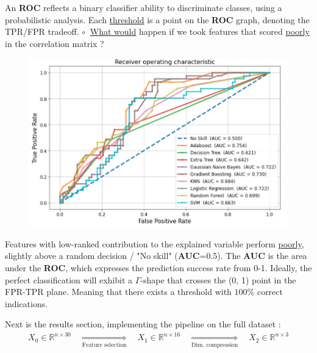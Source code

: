 \documentclass[12pt]{article}
\numberwithin{equation}{section}
\begin{document}
\begin{flushleft}
An \textbf{ROC} reflects a binary classifier ability to discriminate classes, using a probabilistic analysis. Each \underline{threshold} is a point on the \textbf{ROC} graph, denoting the TPR/FPR tradeoff. $\circ \ $ \underline{What would} happen if we took features that scored \underline{poorly} in the correlation matrix ?
\begin{figure}[H]
\centering
\includegraphics[width=0.825\linewidth, center]{ROC_bad.png}
\end{figure}
Features with low-ranked contribution to the explained variable perform \underline{poorly}, slightly above a random decision / "No skill" (\textbf{AUC}=0.5). The \textbf{AUC} is the area under the \textbf{ROC}, which expresses the prediction success rate from 0-1. Ideally, the perfect classification will exhibit a $ \Gamma$-shape that crosses the (0, 1) point in the FPR-TPR plane. Meaning that there exists a threshold with $100 \%$ correct indications.

Next is the results section, implementing the pipeline on the full dataset :
\begin{align*}
X_0 \in \mathbb{R}^{n \times 30} \quad \underset{\text{Feature selection}}{\Rightarrow} \quad X_1 \in \mathbb{R}^{n \times 16} \quad \underset{\text{Dim. compression}}{\Rightarrow} \quad X_2 \in \mathbb{R}^{n \times 3}
\end{align*}


\end{flushleft}
\end{document}
